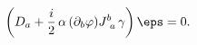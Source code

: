 \begin{equation} 
\left( D_a + \frac{i}{2}\, \alpha\, (\partial_b \varphi)J_{~a}^{b}
 \,\gamma\right) \eps  
=0  .
\end{equation}

